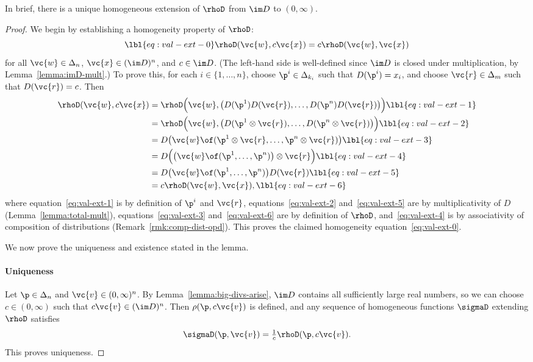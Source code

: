 In brief, there is a unique homogeneous extension of $\rhoD$ from
$\im D$ to $(0, \infty)$. 

\begin{proof}
We begin by establishing a homogeneity property of $\rhoD$:
% 
\begin{equation}
\lbl{eq:val-ext-0}
\rhoD(\vc{w}, c\vc{x})
=
c \rhoD(\vc{w}, \vc{x})
\end{equation}
% 
for all $\vc{w} \in \Delta_n$, $\vc{x} \in (\im D)^n$, and $c \in \im D$.
(The left-hand side is well-defined since $\im D$ is closed under
multiplication, by Lemma~\ref{lemma:imD-mult}.)  To prove this, for
each $i \in \{1, \ldots, n\}$, choose $\p^i \in \Delta_{k_i}$ such that
$D(\p^i) = x_i$, and choose $\vc{r} \in \Delta_m$ such that $D(\vc{r}) =
c$.  Then
% 
\begin{align}
\rhoD(\vc{w}, c\vc{x}) &
=
\rhoD\Bigl( \vc{w}, \bigl( 
D(\p^1)D(\vc{r}), \ldots, D(\p^n)D(\vc{r}) \bigr)\Bigr)
\lbl{eq:val-ext-1}    \\
&
=
\rhoD\Bigl( \vc{w}, \bigl( 
D(\p^1 \otimes \vc{r}), \ldots, D(\p^n \otimes \vc{r}) \bigr)\Bigr)
\lbl{eq:val-ext-2}    \\
&
=
D\bigl( \vc{w} \of 
(\p^1 \otimes \vc{r}, \ldots, \p^n \otimes \vc{r}) 
\bigr)
\lbl{eq:val-ext-3}    \\
&
=
D\Bigl( \bigl( \vc{w} \of (\p^1, \ldots, \p^n) \bigr) \otimes \vc{r} \Bigr)
\lbl{eq:val-ext-4}    \\
&
=
D\bigl( \vc{w} \of (\p^1, \ldots, \p^n) \bigr) D(\vc{r})        
\lbl{eq:val-ext-5}    \\
&
=
c\rhoD(\vc{w}, \vc{x}),
\lbl{eq:val-ext-6}
\end{align}
% 
where equation~\eqref{eq:val-ext-1} is by definition of $\p^i$ and
$\vc{r}$, equations~\eqref{eq:val-ext-2} and~\eqref{eq:val-ext-5} are by
multiplicativity of $D$ (Lemma~\ref{lemma:total-mult}),
equations~\eqref{eq:val-ext-3} and~\eqref{eq:val-ext-6} are by definition
of $\rhoD$, and~\eqref{eq:val-ext-4} is by associativity of composition of
distributions (Remark~\ref{rmk:comp-dist-opd}).  This proves the claimed
homogeneity equation~\eqref{eq:val-ext-0}.

We now prove the uniqueness and existence stated in the lemma.

\paragraph*{Uniqueness}
Let $\p \in \Delta_n$ and $\vc{v} \in (0, \infty)^n$.  By
Lemma~\ref{lemma:big-divs-arise}, $\im D$ contains all sufficiently large
real numbers, so we can choose $c \in (0, \infty)$ such that $c\vc{v}
\in (\im D)^n$.  Then $\rho(\p, c\vc{v})$ is defined, and any sequence of
homogeneous functions $\sigmaD$ extending $\rhoD$ satisfies
\[
\sigmaD(\p, \vc{v})
=
\tfrac{1}{c} \rhoD(\p, c\vc{v}).
\]
This proves uniqueness.


\end{proof}
